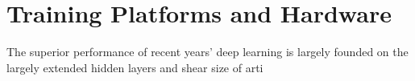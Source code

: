 \section{Training Platforms and Hardware}
The superior performance of recent years' deep learning is largely founded on the largely extended hidden layers and shear size of arti
